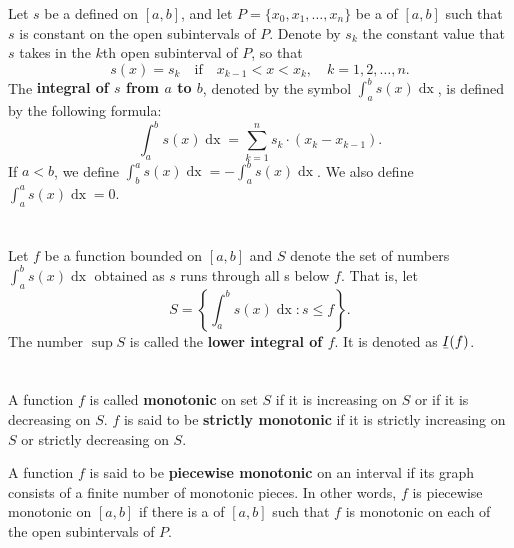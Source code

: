 \documentclass{report}
\begin{document}
  Let $s$ be a  defined on $[a, b]$, and let
    $P = \{x_0, x_1, \ldots, x_n\}$ be a  of $[a, b]$
    such that $s$ is constant on the open subintervals of $P$.
  Denote by $s_k$ the constant value that $s$ takes in the $k$th open
    subinterval of $P$, so that
    $$s(x) = s_k \quad\text{if}\quad x_{k-1} < x < x_k, \quad k
           = 1, 2, \ldots, n.$$
  The \textbf{integral of $s$ from $a$ to $b$}, denoted by the symbol
    $\int_a^b s(x)\mathop{dx}$, is defined by the following formula:
    $$\int_a^b s(x) \mathop{dx} = \sum_{k=1}^n s_k \cdot (x_k - x_{k-1}).$$
  If $a < b$, we define
    $\int_b^a s(x) \mathop{dx} = -\int_a^b s(x) \mathop{dx}$.
  We also define $\int_a^a s(x) \mathop{dx} = 0$.

\section{}%

  Let $f$ be a function bounded on $[a, b]$ and $S$ denote the set of numbers
    $\int_a^b s(x) \mathop{dx}$ obtained as $s$ runs through all
    s below $f$.
  That is, let $$S = \left\{ \int_a^b s(x) \mathop{dx} : s \leq f \right\}.$$
  The number $\sup{S}$ is called the \textbf{lower integral of $f$}.
  It is denoted as $\ubar{I}(f)$.

\section{}%

  A function $f$ is called \textbf{monotonic} on set $S$ if it is increasing on
    $S$ or if it is decreasing on $S$.
  $f$ is said to be \textbf{strictly monotonic} if it is strictly increasing on
    $S$ or strictly decreasing on $S$.

  A function $f$ is said to be \textbf{piecewise monotonic} on an interval if
    its graph consists of a finite number of monotonic pieces.
  In other words, $f$ is piecewise monotonic on $[a, b]$ if there is a
     of $[a, b]$ such that $f$ is monotonic on each of
    the open subintervals of $P$.

\section{}%
\end{document}
